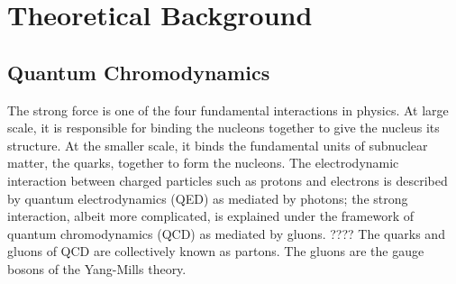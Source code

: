 \chapter{Theoretical Background} \label{ch:background}




\section{Quantum Chromodynamics}\label{section:QCD}
The strong force is one of the four fundamental interactions in physics. At large scale, it is responsible for binding the nucleons together to give the nucleus its structure. At the smaller scale, it binds the fundamental units of subnuclear matter, the quarks, together to form the nucleons. The electrodynamic interaction between charged particles such as protons and electrons is described by quantum electrodynamics (QED) as mediated by photons; the strong interaction, albeit more complicated, is explained under the framework of quantum chromodynamics (QCD) as mediated by gluons. \cite{KAPUSTA1979461, Shuryak1988} ???? The quarks and gluons of QCD are collectively known as partons. The gluons are the gauge bosons of the Yang-Mills theory.

